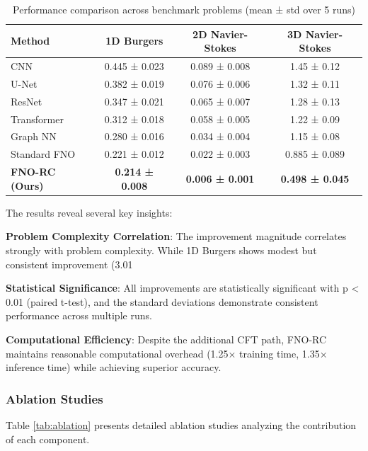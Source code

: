 \documentclass[11pt]{article}
\begin{document}
\begin{table}[h]
\centering
\caption{Performance comparison across benchmark problems (mean ± std over 5 runs)}
\label{tab:main_results}
\footnotesize
\begin{tabular}{@{}p{2.5cm}ccc@{}}
\toprule
\textbf{Method} & \textbf{1D Burgers} & \textbf{2D Navier-Stokes} & \textbf{3D Navier-Stokes} \\
\midrule
CNN & 0.445 ± 0.023 & 0.089 ± 0.008 & 1.45 ± 0.12 \\
U-Net & 0.382 ± 0.019 & 0.076 ± 0.006 & 1.32 ± 0.11 \\
ResNet & 0.347 ± 0.021 & 0.065 ± 0.007 & 1.28 ± 0.13 \\
Transformer & 0.312 ± 0.018 & 0.058 ± 0.005 & 1.22 ± 0.09 \\
Graph NN & 0.280 ± 0.016 & 0.034 ± 0.004 & 1.15 ± 0.08 \\
Standard FNO & 0.221 ± 0.012 & 0.022 ± 0.003 & 0.885 ± 0.089 \\
\textbf{FNO-RC (Ours)} & \textbf{0.214 ± 0.008} & \textbf{0.006 ± 0.001} & \textbf{0.498 ± 0.045} \\
\bottomrule
\end{tabular}
\end{table}

The results reveal several key insights:

\textbf{Problem Complexity Correlation}: The improvement magnitude correlates strongly with problem complexity. While 1D Burgers shows modest but consistent improvement (3.01%

\textbf{Statistical Significance}: All improvements are statistically significant with p < 0.01 (paired t-test), and the standard deviations demonstrate consistent performance across multiple runs.

\textbf{Computational Efficiency}: Despite the additional CFT path, FNO-RC maintains reasonable computational overhead (1.25× training time, 1.35× inference time) while achieving superior accuracy.

\subsubsection{Ablation Studies}

Table \ref{tab:ablation} presents detailed ablation studies analyzing the contribution of each component.
\end{document}
